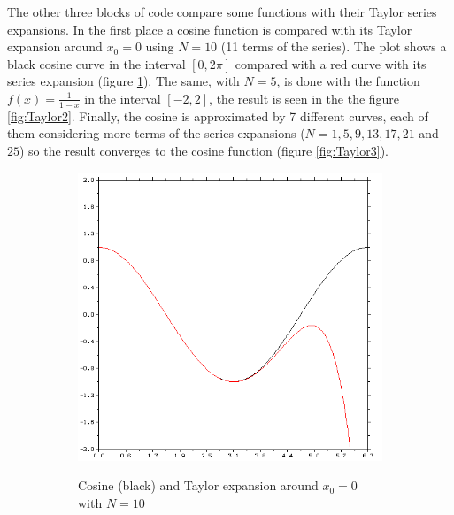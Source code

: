 The other three blocks of code compare some functions with their Taylor series expansions. In the first place a cosine function is compared with its Taylor expansion around $x_0 = 0$ using $N = 10$ (11 terms of the series). The plot shows a black cosine curve in the interval $\left[0,2\pi\right]$ compared with a red curve with its series expansion (figure \ref{fig:Taylor1}). The same, with $N = 5$, is done with the function $f(x) = \frac{1}{1-x}$ in the interval $\left[-2,2\right]$, the result is seen in the the figure \ref{fig:Taylor2}. Finally, the cosine is approximated by 7 different curves, each of them considering more terms of the series expansions ($N = 1, 5, 9, 13, 17, 21$ and $25$) so the result converges to the cosine function (figure \ref{fig:Taylor3}). 

\begin{figure}
    \begin{subfigure}[h]{0.4\textwidth}
        \centering
        \includegraphics[width = \textwidth]{./doc/Figures/Taylor1.png}  \\
        \caption{Cosine (black) and Taylor expansion around $x_0 = 0$ with $N = 10$}
        \label{fig:Taylor1}
    \end{subfigure}
    \hspace{\fill}
    \begin{subfigure}[h]{0.4\textwidth}
        \centering

\end{subfigure}
\end{figure}
